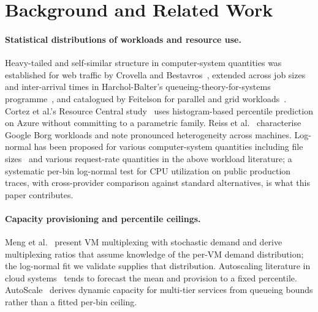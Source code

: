 \documentclass[11pt,a4paper]{article}
\begin{document}
\section{Background and Related Work}
\label{sec:related}

\paragraph{Statistical distributions of workloads and resource use.}
Heavy-tailed and self-similar structure in computer-system quantities was
established for web traffic by Crovella and
Bestavros~\cite{crovella1997selfsimilarity}, extended across job sizes and
inter-arrival times in Harchol-Balter's queueing-theory-for-systems
programme~\cite{harcholbalter2013performance}, and catalogued by Feitelson
for parallel and grid workloads~\cite{feitelson2015workload}. Cortez et
al.'s Resource Central study~\cite{cortez2017resource} uses histogram-based
percentile prediction on Azure without committing to a parametric family.
Reiss et al.~\cite{reiss2012heterogeneity} characterise Google Borg
workloads and note pronounced heterogeneity across machines. Log-normal has
been proposed for various computer-system quantities including file
sizes~\cite{downey2001lognormal} and various request-rate quantities in the
above workload literature; a systematic per-bin log-normal test for CPU
utilization on public production traces, with cross-provider comparison
against standard alternatives, is what this paper contributes.

\paragraph{Capacity provisioning and percentile ceilings.}
Meng et al.~\cite{meng2010vmmultiplex} present VM multiplexing with
stochastic demand and derive multiplexing ratios that assume knowledge of
the per-VM demand distribution; the log-normal fit we validate supplies
that distribution. Autoscaling literature in cloud
systems~\cite{gong2010press,wang2016data,bodik2009statistical} tends to
forecast the mean and provision to a fixed percentile. AutoScale~\cite{gandhi2012autoscale}
derives dynamic capacity for multi-tier services from queueing bounds
rather than a fitted per-bin ceiling.
\end{document}
